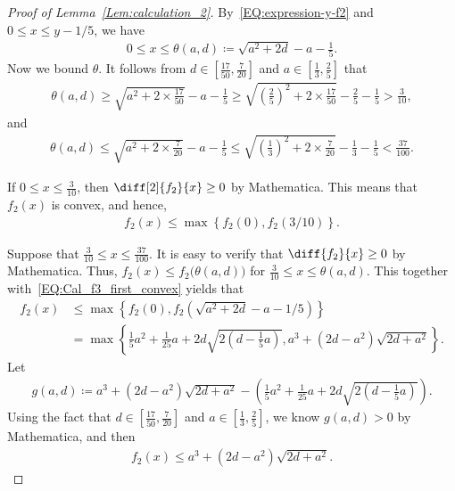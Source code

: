 \documentclass[11pt,a4paper]{article}
\begin{document}
\begin{appendix}
\begin{proof}[Proof of Lemma~\ref{Lem:calculation_2}]
By~\eqref{EQ:expression-y-f2} and $0 \le x \le y - 1/5$, we have 
\begin{align*}
0 \le x \le \theta(a,d) \coloneqq \sqrt{a^2+2d}-a -\frac{1}{5}.
\end{align*}
Now we bound $\theta$. 
It follows from $d \in \left[\tfrac{17}{50}, \tfrac{7}{20}\right]$ and $a \in \left[\tfrac{1}{3},\tfrac{2}{5}\right]$ that 
\begin{align*}
\theta(a,d) 
\ge \sqrt{a^2+2 \times \frac{17}{50}}-a -\frac{1}{5}
\ge \sqrt{\left(\frac{2}{5}\right)^2+2 \times \frac{17}{50}}-\frac{2}{5} -\frac{1}{5}
> \frac{3}{10}, 
\end{align*}
and 
\begin{align*}
\theta(a,d)
\le \sqrt{a^2+2 \times \frac{7}{20}} - a -\frac{1}{5}
\le \sqrt{\left(\frac{1}{3}\right)^2+2 \times \frac{7}{20}}-\frac{1}{3} -\frac{1}{5}< \frac{37}{100}. 
\end{align*}

If $0\le x \le \tfrac{3}{10}$, then $\diff[2]{f_2}{x} \ge 0$ by Mathematica. 
This means that $f_2(x)$ is convex, and hence,   
\begin{align}\label{EQ:Cal_f3_first_convex}
f_2(x) 
\le \max\left\{f_2(0),f_2(3/10)\right\}.
\end{align}

Suppose that $\frac{3}{10}\le x \le \frac{37}{100}$. 
It is easy to verify that $\diff{f_2}{x} \ge 0$ by Mathematica. 
Thus, $f_2(x) \le f_2\big(\theta(a,d)\big)$ for $\tfrac{3}{10} \le x \le \theta(a,d)$. 
This together with~\eqref{EQ:Cal_f3_first_convex} yields that 
\begin{align*}
f_2(x) 
&\le \max\left\{f_2(0), f_2\left(\sqrt{a^2+2d}-a -1/5\right)\right\}\\
&= \max \left\{\frac{1}{5}a^2+\frac{1}{25}a+2d\sqrt{2\left(d-\frac{1}{5}a\right)},a^3 +(2d-a^2)\sqrt{2d+a^2}\right\}. 
\end{align*}
Let 
\begin{align*}
g(a,d) \coloneqq a^3 +(2d-a^2)\sqrt{2d+a^2}-\left(\frac{1}{5}a^2+\frac{1}{25}a+2d\sqrt{2\left(d-\frac{1}{5}a\right)}\right). 
\end{align*}
Using the fact that $d \in \left[\tfrac{17}{50}, \tfrac{7}{20}\right]$ and $a \in \left[\tfrac{1}{3},\tfrac{2}{5}\right]$, we know $g(a,d) > 0$ by Mathematica, and then 
\begin{align*}
f_2(x) \le a^3 +(2d-a^2)\sqrt{2d+a^2}.
\end{align*}
\end{proof}


\end{appendix}
\end{document}
